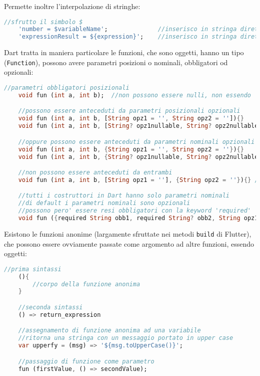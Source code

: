 Permette inoltre l'interpolazione di stringhe:
\begin{lstlisting}[language=dart, firstnumber=1,caption={Dart interpolazone stringhe}]
    //sfrutto il simbolo $
    'number = $variableName';              //inserisco in stringa direttamente una variabile
    'expressionResult = ${expression}';    //inserisco in stringa direttamente un'espressione
\end{lstlisting}

Dart tratta in maniera particolare le funzioni, che sono oggetti, hanno un tipo (\verb+Function+), possono avere parametri posizioni o nominali, obbligatori od opzionali: 
\begin{lstlisting}[language=dart, firstnumber=1,caption={Dart parametri funzioni}]
    //parametri obbligatori posizionali
    void fun (int a, int b);  //non possono essere nulli, non essendo 'int? a'

    //possono essere anteceduti da parametri posizionali opzionali
    void fun (int a, int b, [String opz1 = '', String opz2 = '']){}
    void fun (int a, int b, [String? opz1nullable, String? opz2nullable]){}

    //oppure possono essere anteceduti da parametri nominali opzionali
    void fun (int a, int b, {String opz1 = '', String opz2 = ''}){}
    void fun (int a, int b, {String? opz1nullable, String? opz2nullable}){}

    //non possono essere anteceduti da entrambi
    void fun (int a, int b, [String opz1 = ''], {String opz2 = ''}){} //compile error

    //tutti i costruttori in Dart hanno solo parametri nominali
    //di default i parametri nominali sono opzionali
    //possono pero' essere resi obbligatori con la keyword 'required'
    void fun ({required String obb1, required String? obb2, String opz1 = ''}){}
\end{lstlisting}

Esistono le funzioni anonime (largamente sfruttate nei metodi \verb+build+ di Flutter), che possono essere ovviamente passate come argomento ad altre funzioni, essendo oggetti:
\begin{lstlisting}[language=dart, firstnumber=1,caption={Dart funzioni anonime}]
    //prima sintassi
    (){
        //corpo della funzione anonima
    } 

    //seconda sintassi
    () => return_expression

    //assegnamento di funzione anonima ad una variabile
    //ritorna una stringa con un messaggio portato in upper case
    var upperfy = (msg) => '${msg.toUpperCase()}';

    //passaggio di funzione come parametro
    fun (firstValue, () => secondValue);
\end{lstlisting}

